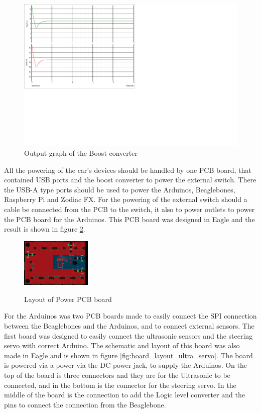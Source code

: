 \documentclass[11pt, titlepage]{article} %
\begin{document}
\begin{figure}
	\includegraphics{graph_of_boost_out.png}
	\caption{Output graph of the Boost converter}
	\label{fig:graph_boost}
\end{figure}

All the powering of the car's devices should be handled by one PCB board, that contained USB ports and the boost converter to power the external switch. There the USB-A type ports should be used to power the Arduinos, Beaglebones, Raspberry Pi and Zodiac FX. For the powering of the external switch should a cable be connected from the PCB to the switch, it also to power outlets to power the PCB board for the Arduinos. This PCB board was designed in Eagle and the result is shown in figure \ref{fig:power_pcb_layout}. 

\begin{figure}
	\includegraphics[width=0.3\textwidth]{power_board_layout.png}
	\label{fig:power_pcb_layout}
	\caption{Layout of Power PCB board}
	
\end{figure}

For the Arduinos was two PCB boards made to easily connect the SPI connection between the Beaglebones and the Arduinos, and to connect external sensors. The first board was designed to easily connect the ultrasonic sensors and the steering servo with correct Arduino. The schematic and layout of this board was also made in Eagle and is shown in figure \ref{fig:board_layout_ultra_servo}. The board is powered via a power via the DC power jack, to supply the Arduinos. On the top of the board is three connectors and they are for the Ultrasonic to be connected, and in the bottom is the connector for the steering servo. In the middle of the board is the connection to add the Logic level converter and the pins to connect the connection from the Beaglebone. 
\end{document}
